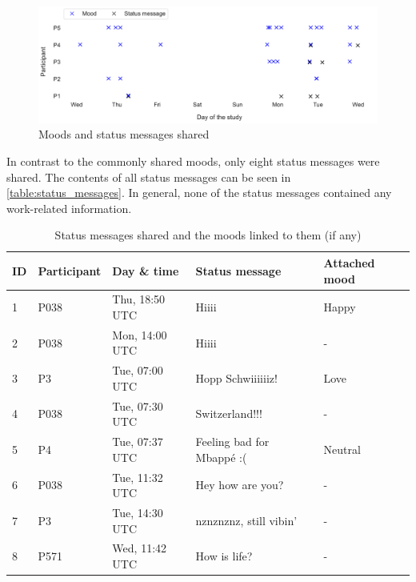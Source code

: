\begin{figure}[h]
    \centering
    \includegraphics[width=\linewidth]{plots/moods_status_messages.pdf}
    \caption{Moods and status messages shared}
    \label{fig:moods_status_messages}
\end{figure}


In contrast to the commonly shared moods, only eight status messages were shared. The contents of all status messages can be seen in \autoref{table:status_messages}. In general, none of the status messages contained any work-related information.

\begin{table}[h] \footnotesize
    \centering
    \begin{tabularx}{.8\textwidth}{l l l l l}
        \toprule
        ID & Participant & Day \& time    & Status message            & Attached mood \\
        \midrule
        1  & P038        & Thu, 18:50 UTC & Hiiii                     & Happy         \\
        2  & P038        & Mon, 14:00 UTC & Hiiii                     & -             \\
        3  & P3          & Tue, 07:00 UTC & Hopp Schwiiiiiiz!         & Love          \\
        4  & P038        & Tue, 07:30 UTC & Switzerland!!!            & -             \\
        5  & P4          & Tue, 07:37 UTC & Feeling bad for Mbappé :( & Neutral       \\
        6  & P038        & Tue, 11:32 UTC & Hey how are you?          & -             \\
        7  & P3          & Tue, 14:30 UTC & nznznznz, still vibin'    & -             \\
        8  & P571        & Wed, 11:42 UTC & How is life?              & -             \\
        \bottomrule
    \end{tabularx}
    \caption{Status messages shared and the moods linked to them (if any)}
    \label{table:status_messages}
\end{table}

